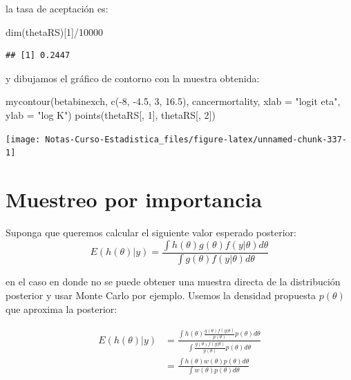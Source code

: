 \documentclass[
  12pt,
]{book}
\newenvironment{Shaded}{\begin{snugshade}}{\end{snugshade}}
\newcommand{\AttributeTok}[1]{\textcolor[rgb]{0.77,0.63,0.00}{#1}}
\newcommand{\DecValTok}[1]{\textcolor[rgb]{0.00,0.00,0.81}{#1}}
\newcommand{\FloatTok}[1]{\textcolor[rgb]{0.00,0.00,0.81}{#1}}
\newcommand{\FunctionTok}[1]{\textcolor[rgb]{0.00,0.00,0.00}{#1}}
\newcommand{\NormalTok}[1]{#1}
\newcommand{\SpecialCharTok}[1]{\textcolor[rgb]{0.00,0.00,0.00}{#1}}
\newcommand{\StringTok}[1]{\textcolor[rgb]{0.31,0.60,0.02}{#1}}
\theoremstyle{definition}
\theoremstyle{definition}
\theoremstyle{definition}
\theoremstyle{definition}
\theoremstyle{remark}
\begin{document}
la tasa de aceptación es:

\begin{Shaded}
\begin{Highlighting}[]
\FunctionTok{dim}\NormalTok{(thetaRS)[}\DecValTok{1}\NormalTok{]}\SpecialCharTok{/}\DecValTok{10000}
\end{Highlighting}
\end{Shaded}

\begin{verbatim}
## [1] 0.2447
\end{verbatim}

y dibujamos el gráfico de contorno con la muestra obtenida:

\begin{Shaded}
\begin{Highlighting}[]
\FunctionTok{mycontour}\NormalTok{(betabinexch, }\FunctionTok{c}\NormalTok{(}\SpecialCharTok{{-}}\DecValTok{8}\NormalTok{, }\SpecialCharTok{{-}}\FloatTok{4.5}\NormalTok{, }\DecValTok{3}\NormalTok{, }\FloatTok{16.5}\NormalTok{), cancermortality,}
    \AttributeTok{xlab =} \StringTok{"logit eta"}\NormalTok{, }\AttributeTok{ylab =} \StringTok{"log K"}\NormalTok{)}
\FunctionTok{points}\NormalTok{(thetaRS[, }\DecValTok{1}\NormalTok{], thetaRS[, }\DecValTok{2}\NormalTok{])}
\end{Highlighting}
\end{Shaded}

\begin{center}\texttt{[image: Notas-Curso-Estadistica\_files/figure-latex/unnamed-chunk-337-1]} \end{center}

\hypertarget{muestreo-por-importancia}{%
\section{Muestreo por importancia}\label{muestreo-por-importancia}}

Suponga que queremos calcular el siguiente valor esperado posterior:
\[E(h(\theta)|y)=\frac{\int h(\theta)g(\theta)f(y|\theta)d\theta}{\int g(\theta)f(y|\theta)d\theta}\]

en el caso en donde no se puede obtener una muestra directa de la distribución posterior y usar Monte Carlo por ejemplo. Usemos la densidad propuesta \(p(\theta)\) que aproxima la posterior:

\begin{align*}
E(h(\theta)|y)&=\frac{\int h(\theta)\frac{g(\theta)f(y|\theta)}{p(\theta)}p(\theta)d\theta}{\int \frac{g(\theta)f(y|\theta)}{p(\theta)}p(\theta)d\theta}\\
&=\frac{\int h(\theta)w(\theta)p(\theta)d\theta}{\int w(\theta)p(\theta)d\theta}
\end{align*}
\end{document}
